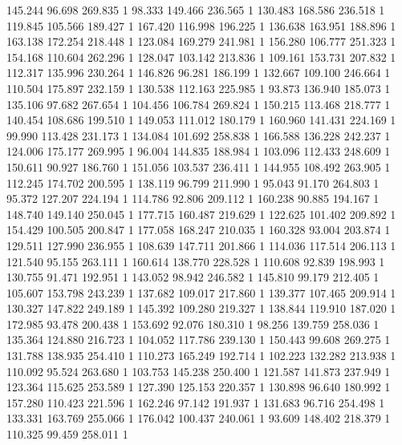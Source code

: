 	145.244	96.698	269.835	1
	98.333	149.466	236.565	1
	130.483	168.586	236.518	1
	119.845	105.566	189.427	1
	167.420	116.998	196.225	1
	136.638	163.951	188.896	1
	163.138	172.254	218.448	1
	123.084	169.279	241.981	1
	156.280	106.777	251.323	1
	154.168	110.604	262.296	1
	128.047	103.142	213.836	1
	109.161	153.731	207.832	1
	112.317	135.996	230.264	1
	146.826	96.281	186.199	1
	132.667	109.100	246.664	1
	110.504	175.897	232.159	1
	130.538	112.163	225.985	1
	93.873	136.940	185.073	1
	135.106	97.682	267.654	1
	104.456	106.784	269.824	1
	150.215	113.468	218.777	1
	140.454	108.686	199.510	1
	149.053	111.012	180.179	1
	160.960	141.431	224.169	1
	99.990	113.428	231.173	1
	134.084	101.692	258.838	1
	166.588	136.228	242.237	1
	124.006	175.177	269.995	1
	96.004	144.835	188.984	1
	103.096	112.433	248.609	1
	150.611	90.927	186.760	1
	151.056	103.537	236.411	1
	144.955	108.492	263.905	1
	112.245	174.702	200.595	1
	138.119	96.799	211.990	1
	95.043	91.170	264.803	1
	95.372	127.207	224.194	1
	114.786	92.806	209.112	1
	160.238	90.885	194.167	1
	148.740	149.140	250.045	1
	177.715	160.487	219.629	1
	122.625	101.402	209.892	1
	154.429	100.505	200.847	1
	177.058	168.247	210.035	1
	160.328	93.004	203.874	1
	129.511	127.990	236.955	1
	108.639	147.711	201.866	1
	114.036	117.514	206.113	1
	121.540	95.155	263.111	1
	160.614	138.770	228.528	1
	110.608	92.839	198.993	1
	130.755	91.471	192.951	1
	143.052	98.942	246.582	1
	145.810	99.179	212.405	1
	105.607	153.798	243.239	1
	137.682	109.017	217.860	1
	139.377	107.465	209.914	1
	130.327	147.822	249.189	1
	145.392	109.280	219.327	1
	138.844	119.910	187.020	1
	172.985	93.478	200.438	1
	153.692	92.076	180.310	1
	98.256	139.759	258.036	1
	135.364	124.880	216.723	1
	104.052	117.786	239.130	1
	150.443	99.608	269.275	1
	131.788	138.935	254.410	1
	110.273	165.249	192.714	1
	102.223	132.282	213.938	1
	110.092	95.524	263.680	1
	103.753	145.238	250.400	1
	121.587	141.873	237.949	1
	123.364	115.625	253.589	1
	127.390	125.153	220.357	1
	130.898	96.640	180.992	1
	157.280	110.423	221.596	1
	162.246	97.142	191.937	1
	131.683	96.716	254.498	1
	133.331	163.769	255.066	1
	176.042	100.437	240.061	1
	93.609	148.402	218.379	1
	110.325	99.459	258.011	1
